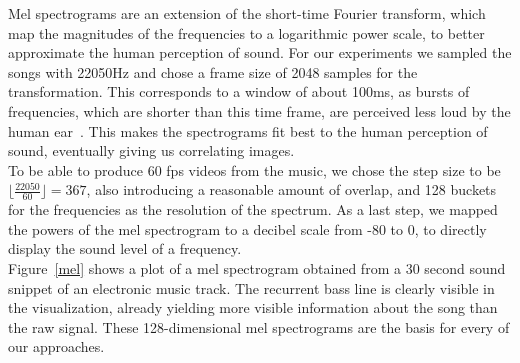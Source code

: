     \indent Mel spectrograms are an extension of the short-time Fourier transform, which map the magnitudes of the frequencies to a logarithmic power scale, to better approximate the human perception of sound.
    For our experiments we sampled the songs with 22050Hz and chose a frame size of 2048 samples for the transformation.
    This corresponds to a window of about 100ms, as bursts of frequencies, which are shorter than this time frame, are perceived less loud by the human ear~\cite{Acoustics}.
    This makes the spectrograms fit best to the human perception of sound, eventually giving us correlating images.\\
    To be able to produce 60 fps videos from the music, we chose the step size to be $\lfloor \frac{22050}{60} \rfloor = 367$, also introducing a reasonable amount of overlap, and 128 buckets for the frequencies as the resolution of the spectrum.
    As a last step, we mapped the powers of the mel spectrogram to a decibel scale from -80 to 0, to directly display the sound level of a frequency.\\ 
    \indent Figure~\ref{mel} shows a plot of a mel spectrogram obtained from a 30 second sound snippet of an electronic music track. 
    The recurrent bass line is clearly visible in the visualization, already yielding more visible information about the song than the raw signal.
    These 128-dimensional mel spectrograms are the basis for every of our approaches.

